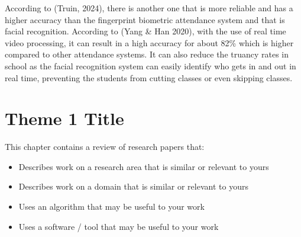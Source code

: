 According to (Truin, 2024), there is another one that is more reliable and has a higher accuracy than the fingerprint biometric attendance system and that is facial recognition. According to (Yang \& Han 2020), with the use of real time video processing, it can result in a high accuracy for about 82\% which is higher compared to other attendance systems. It can also reduce the truancy rates in school as the facial recognition system can easily identify who gets in and out in real time, preventing the students from cutting classes or even skipping classes.



\begin{comment}

%
%
Guide on Writing your RRL chapter

1. Identify the keywords with respect to your research
      One keyword = One document section
                Examples: 2.1 Story Generation Systems
			 2.2 Knowledge Representation

2.  Find references using these keywords

3.  For each of the references that you find,
        Check: Is it relevant to your research?
        Use their references to find more relevant works.

4. Identify a set of criteria for comparison.
       It will serve as a guide to help you focus on what to look for

5. Write a summary focusing on -
       What: A short description of the work
       How: A summary of the approach it utilized
       Findings: If applicable, provide the results
        Why: Relevance to your work

6. At the end of each section,  show a Table of Comparison of the related works
   and your proposed project/system

\end{comment}

\section{Theme 1 Title}
This chapter  contains a review of research papers that:
%
%
\begin{itemize}
\item Describes work on a research area that is similar or relevant to yours
\item Describes work on a domain that is similar or relevant to yours
\item Uses an algorithm that may be useful to your work
\item Uses a software / tool that may be useful to your work
\end{itemize}

